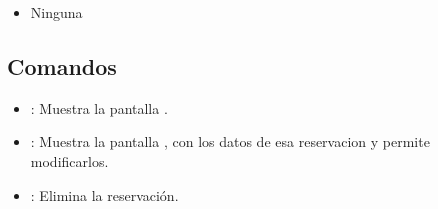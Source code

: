	\begin{itemize}
		\item Ninguna
	\end{itemize}

\subsection{Comandos}

\begin{itemize}
	\item {}: Muestra la pantalla .
	\item {}: Muestra la pantalla , con los datos de esa reservacion y permite modificarlos.
	\item {}: Elimina la reservación.
\end{itemize}

